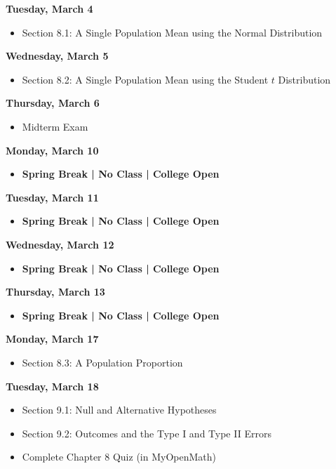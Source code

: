 \documentclass[11pt]{article}
\begin{document}
\textbf{Tuesday, March 4}

\begin{itemize}
\item Section 8.1: A Single Population Mean using the Normal Distribution
\end{itemize}

\textbf{Wednesday, March 5}

\begin{itemize}
\item Section 8.2: A Single Population Mean using the Student $t$ Distribution
\end{itemize}

\textbf{Thursday, March 6}

\begin{itemize}
\item Midterm Exam
\end{itemize}

\textbf{Monday, March 10}

\begin{itemize}
\item \textbf{Spring Break | No Class | College Open}
\end{itemize}

\textbf{Tuesday, March 11}

\begin{itemize}
\item \textbf{Spring Break | No Class | College Open}
\end{itemize}

\textbf{Wednesday, March 12}

\begin{itemize}
\item \textbf{Spring Break | No Class | College Open}
\end{itemize}

\textbf{Thursday, March 13}

\begin{itemize}
\item \textbf{Spring Break | No Class | College Open}
\end{itemize}

\textbf{Monday, March 17}

\begin{itemize}
\item Section 8.3: A Population Proportion
\end{itemize}

\textbf{Tuesday, March 18}

\begin{itemize}
\item Section 9.1: Null and Alternative Hypotheses
\item Section 9.2: Outcomes and the Type I and Type II Errors
\item Complete Chapter 8 Quiz (in MyOpenMath)
\end{itemize}
\end{document}
